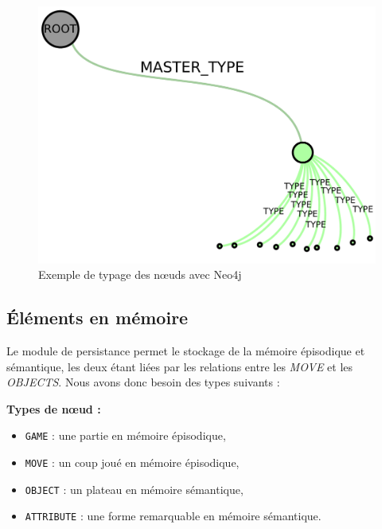 \begin{figure}[H]
\includegraphics[width=\textwidth]{files/neo4j/example_node_type}
\caption{Exemple de typage des nœuds avec Neo4j}
\label{example_node_type}
\end{figure}

\subsection{Éléments en mémoire}

Le module de persistance permet le stockage de la mémoire épisodique et sémantique, les deux étant liées par les relations entre les \emph{MOVE} et les \emph{OBJECTS}. Nous avons donc besoin des types suivants : 

\textbf{Types de nœud :}
\begin{itemize}
	\item \texttt{GAME} : une partie en mémoire épisodique, 
	\item \texttt{MOVE} : un coup joué en mémoire épisodique,
	\item \texttt{OBJECT} : un plateau en mémoire sémantique,
	\item \texttt{ATTRIBUTE} : une forme remarquable en mémoire sémantique.
\end{itemize}


